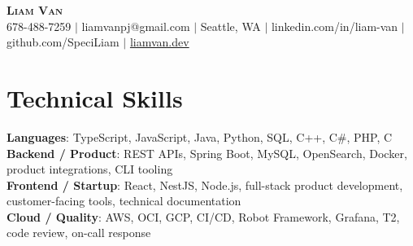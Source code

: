 \documentclass[letterpaper,11pt]{article}
\begin{document}

%
\begin{center}
    \textbf{\Huge \scshape Liam Van} \\ \vspace{1pt}
    \small 678-488-7259 $|$ \small {liamvanpj@gmail.com} $|$ Seattle, WA
 {{$|$ linkedin.com/in/liam-van} {$|$ github.com/SpeciLiam} {$|$ \href{https://liamvan.dev}{liamvan.dev}}}

\end{center}

\section{Technical Skills}
 \begin{itemize}[leftmargin=0.15in, label={}]
    \small{\item{
     \textbf{Languages}{: TypeScript, JavaScript, Java, Python, SQL, C++, C\#, PHP, C} \\
     \textbf{Backend / Product}{: REST APIs, Spring Boot, MySQL, OpenSearch, Docker, product integrations, CLI tooling} \\
     \textbf{Frontend / Startup}{: React, NestJS, Node.js, full-stack product development, customer-facing tools, technical documentation} \\
     \textbf{Cloud / Quality}{: AWS, OCI, GCP, CI/CD, Robot Framework, Grafana, T2, code review, on-call response} \\
    }}
 \end{itemize}
%

\end{document}
